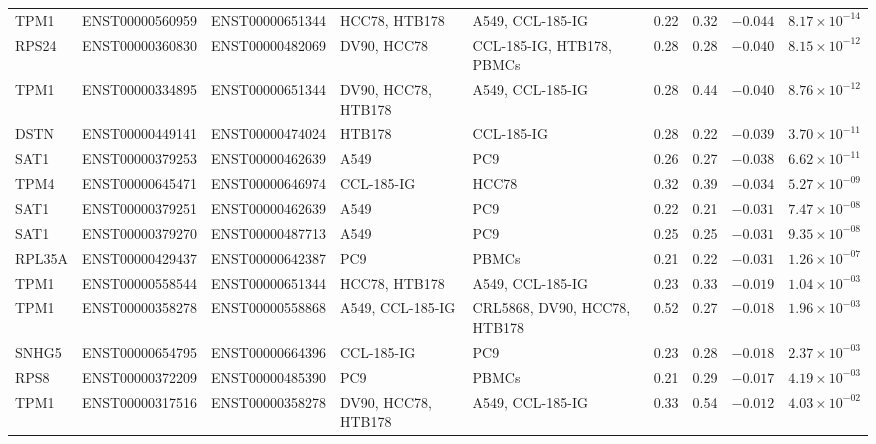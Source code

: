 \begin{landscape}
\begin{longtable}{@{} l l l >{\raggedright\arraybackslash}p{3.4cm} >{\raggedright\arraybackslash}p{3.4cm} r r r r @{}}
TPM1   & ENST00000560959 & ENST00000651344 & HCC78, HTB178 & A549, CCL-185-IG & 0.22 & 0.32 & $-0.044$ & $8.17 \times 10^{-14}$ \\
RPS24  & ENST00000360830 & ENST00000482069 & DV90, HCC78 & CCL-185-IG, HTB178, PBMCs & 0.28 & 0.28 & $-0.040$ & $8.15 \times 10^{-12}$ \\
TPM1   & ENST00000334895 & ENST00000651344 & DV90, HCC78, HTB178 & A549, CCL-185-IG & 0.28 & 0.44 & $-0.040$ & $8.76 \times 10^{-12}$ \\
DSTN   & ENST00000449141 & ENST00000474024 & HTB178 & CCL-185-IG & 0.28 & 0.22 & $-0.039$ & $3.70 \times 10^{-11}$ \\
SAT1   & ENST00000379253 & ENST00000462639 & A549 & PC9 & 0.26 & 0.27 & $-0.038$ & $6.62 \times 10^{-11}$ \\
TPM4   & ENST00000645471 & ENST00000646974 & CCL-185-IG & HCC78 & 0.32 & 0.39 & $-0.034$ & $5.27 \times 10^{-09}$ \\
SAT1   & ENST00000379251 & ENST00000462639 & A549 & PC9 & 0.22 & 0.21 & $-0.031$ & $7.47 \times 10^{-08}$ \\
SAT1   & ENST00000379270 & ENST00000487713 & A549 & PC9 & 0.25 & 0.25 & $-0.031$ & $9.35 \times 10^{-08}$ \\
RPL35A & ENST00000429437 & ENST00000642387 & PC9 & PBMCs & 0.21 & 0.22 & $-0.031$ & $1.26 \times 10^{-07}$ \\
TPM1   & ENST00000558544 & ENST00000651344 & HCC78, HTB178 & A549, CCL-185-IG & 0.23 & 0.33 & $-0.019$ & $1.04 \times 10^{-03}$ \\
TPM1   & ENST00000358278 & ENST00000558868 & A549, CCL-185-IG & CRL5868, DV90, HCC78, HTB178 & 0.52 & 0.27 & $-0.018$ & $1.96 \times 10^{-03}$ \\
SNHG5  & ENST00000654795 & ENST00000664396 & CCL-185-IG & PC9 & 0.23 & 0.28 & $-0.018$ & $2.37 \times 10^{-03}$ \\
RPS8   & ENST00000372209 & ENST00000485390 & PC9 & PBMCs & 0.21 & 0.29 & $-0.017$ & $4.19 \times 10^{-03}$ \\
TPM1   & ENST00000317516 & ENST00000358278 & DV90, HCC78, HTB178 & A549, CCL-185-IG & 0.33 & 0.54 & $-0.012$ & $4.03 \times 10^{-02}$ \\
\end{longtable}
\endgroup
\end{landscape}


